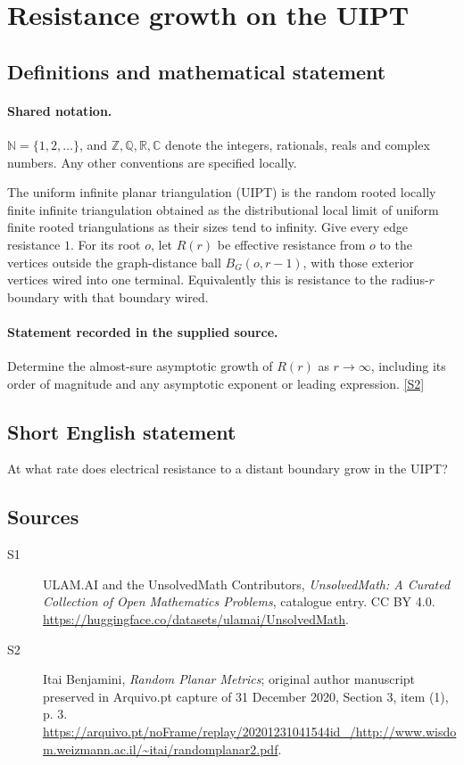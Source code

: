 \documentclass[11pt]{article}
\newcommand{\sref}[2]{\hyperlink{source:#1:#2}{[S#2]}}
\begin{document}
\section{Resistance growth on the UIPT}\label{statement}

\subsection{Definitions and mathematical statement}

\paragraph{Shared notation.}$\mathbb N=\{1,2,\ldots\}$, and $\mathbb Z,\mathbb Q,\mathbb R,\mathbb C$ denote the integers, rationals, reals and complex numbers. Any other conventions are specified locally.


The uniform infinite planar triangulation (UIPT) is the random rooted locally finite infinite triangulation obtained as the distributional local limit of uniform finite rooted triangulations as their sizes tend to infinity. Give every edge resistance $1$. For its root $o$, let $R(r)$ be effective resistance from $o$ to the vertices outside the graph-distance ball $B_G(o,r-1)$, with those exterior vertices wired into one terminal. Equivalently this is resistance to the radius-$r$ boundary with that boundary wired.
\paragraph{Statement recorded in the supplied source.}
Determine the almost-sure asymptotic growth of $R(r)$ as $r\to\infty$, including its order of magnitude and any asymptotic exponent or leading expression. \sref{statement}{2}
\subsection{Short English statement}
At what rate does electrical resistance to a distant boundary grow in the UIPT?
\subsection{Sources}
\begin{description}
\item[\hypertarget{source:statement:1}{S1}] ULAM.AI and the UnsolvedMath Contributors, \emph{UnsolvedMath: A Curated Collection of Open Mathematics Problems}, catalogue entry. CC BY 4.0. \url{https://huggingface.co/datasets/ulamai/UnsolvedMath}.
\item[\hypertarget{source:statement:2}{S2}] Itai Benjamini, \emph{Random Planar Metrics}; original author manuscript preserved in Arquivo.pt capture of 31 December 2020, Section 3, item (1), p. 3. \url{https://arquivo.pt/noFrame/replay/20201231041544id_/http://www.wisdom.weizmann.ac.il/~itai/randomplanar2.pdf}.
\end{description}
\label{end:statement}
\end{document}
